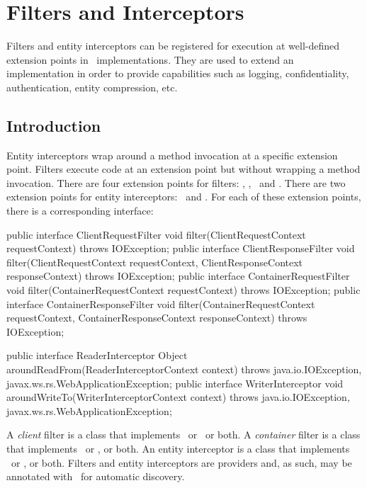 \chapter{Filters and Interceptors}
\label{filters_and_interceptors}

Filters and entity interceptors can be registered for execution at well-defined extension points in \jaxrs\ implementations. They are used to extend an implementation in order to provide capabilities such as logging, confidentiality, authentication, entity compression, etc. 

\section{Introduction}
\label{introduction_filters}
Entity interceptors wrap around a method invocation at a specific extension point. 
Filters execute code at an extension point but without wrapping a method invocation.  There are four extension points for filters: \ClientRequest, \ClientResponse, \ContainerRequest\ and \ContainerResponse. There are two extension points for entity interceptors: \ReadFrom\ and \WriteTo.  For each of these extension points, there is a corresponding interface:

\begin{listing}{1}
public interface ClientRequestFilter {
    void filter(ClientRequestContext requestContext) throws IOException;
}
public interface ClientResponseFilter {
    void filter(ClientRequestContext requestContext, 
        ClientResponseContext responseContext) throws IOException;
}
public interface ContainerRequestFilter {
    void filter(ContainerRequestContext requestContext) throws IOException;
}
public interface ContainerResponseFilter {
    void filter(ContainerRequestContext requestContext, 
        ContainerResponseContext responseContext) throws IOException;
}
\end{listing}

\begin{listing}{1}
public interface ReaderInterceptor {
    Object aroundReadFrom(ReaderInterceptorContext context)
        throws java.io.IOException, javax.ws.rs.WebApplicationException;
}
public interface WriterInterceptor {
    void aroundWriteTo(WriterInterceptorContext context)
        throws java.io.IOException, javax.ws.rs.WebApplicationException;
}
\end{listing}

A {\em client} filter is a class that implements \ClientRequestFilter\ or \ClientResponseFilter\, or both. A {\em container} filter is a class that implements \ContainerRequestFilter\ or \ContainerResponseFilter, or both. An entity interceptor is a class that implements \ReaderInterceptor\ or \WriterInterceptor, or both. Filters and entity interceptors are providers and, as such, may be annotated with \Provider\ for automatic discovery.

